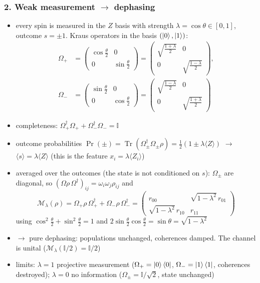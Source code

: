\subsubsection*{2. Weak measurement $\to$ dephasing}
\begin{itemize}
    \item every spin is measured in the $Z$ basis with strength $\lambda = \cos\theta \in [0, 1]$, outcome
    $s = \pm 1$. Kraus operators in the basis $(\ket{0}, \ket{1})$:
    \begin{align*}
        \Omega_+ &= \begin{pmatrix} \cos\frac{\theta}{2} & 0 \\ 0 & \sin\frac{\theta}{2} \end{pmatrix}
        = \begin{pmatrix} \sqrt{\frac{1+\lambda}{2}} & 0 \\ 0 & \sqrt{\frac{1-\lambda}{2}} \end{pmatrix}, \\
        \Omega_- &= \begin{pmatrix} \sin\frac{\theta}{2} & 0 \\ 0 & \cos\frac{\theta}{2} \end{pmatrix}
        = \begin{pmatrix} \sqrt{\frac{1-\lambda}{2}} & 0 \\ 0 & \sqrt{\frac{1+\lambda}{2}} \end{pmatrix}
    \end{align*}
    \item completeness: $\Omega_+^\dagger\Omega_+ + \Omega_-^\dagger\Omega_- = \mathbb{I}$
    \item outcome probabilities $\Pr(\pm) = \operatorname{Tr}(\Omega_\pm^\dagger \Omega_\pm \rho)
    = \frac{1}{2}(1 \pm \lambda \langle Z \rangle)$ $\to$ $\langle s \rangle = \lambda \langle Z \rangle$
    (this is the feature $x_i = \lambda\langle Z_i \rangle$)
    \item averaged over the outcomes (the state is not conditioned on $s$): $\Omega_\pm$ are diagonal, so
    $(\Omega \rho\, \Omega^\dagger)_{ij} = \omega_i \omega_j \rho_{ij}$ and
    \begin{equation*}
        \mathcal{M}_\lambda(\rho) = \Omega_+ \rho\, \Omega_+^\dagger + \Omega_- \rho\, \Omega_-^\dagger
        = \begin{pmatrix} r_{00} & \sqrt{1-\lambda^2}\, r_{01} \\ \sqrt{1-\lambda^2}\, r_{10} & r_{11} \end{pmatrix}
    \end{equation*}
    using $\cos^2\frac{\theta}{2} + \sin^2\frac{\theta}{2} = 1$ and
    $2\sin\frac{\theta}{2}\cos\frac{\theta}{2} = \sin\theta = \sqrt{1-\lambda^2}$
    \item $\to$ pure dephasing: populations unchanged, coherences damped. The channel is unital
    ($\mathcal{M}_\lambda(\mathbb{I}/2) = \mathbb{I}/2$)
    \item limits: $\lambda = 1$ projective measurement ($\Omega_+ = \ket{0}\bra{0}$,
    $\Omega_- = \ket{1}\bra{1}$, coherences destroyed); $\lambda = 0$ no information
    ($\Omega_\pm = \mathbb{I}/\sqrt{2}$, state unchanged)
\end{itemize}


